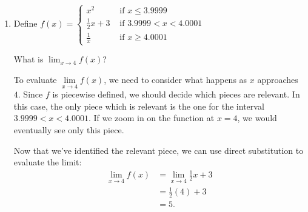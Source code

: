 \documentclass{article}
\begin{document}
\begin{enumerate}[resume]
\begin{enumerate}
      \begin{solution}
        $\displaystyle \lim_{x \rightarrow 4^-} g(x)=2$
      \end{solution}

    \end{enumerate}
  \probonly{\end{multicols}}

  \pspace{1in}

\item 


  \begin{problem}[\vfill]
    Define
    $\displaystyle f(x) =
      \begin{cases} 
        x^2 & \text{ if } x \leq 3.9999 \\
        \frac{1}{2} x + 3 & \text{ if } 3.9999 < x < 4.0001 \\
        \frac{1}{x} & \text{ if } x \geq 4.0001    
      \end{cases}$

    What is $\displaystyle \lim_{x \to 4} f(x)$?
  \end{problem}

  \begin{solution}
    To evaluate $\lim\limits_{x \to 4} f(x)$, we need to consider what happens as $x$ approaches $4$.
    Since $f$ is piecewise defined, we should decide which pieces are relevant. In this case,
    the only piece which is relevant is the one for the interval $3.9999 < x < 4.0001$. If we
    zoom in on the function at $x=4$, we would eventually see only this piece.

    Now that we've identified the relevant piece, we can use direct substitution to evaluate the limit:
    \begin{align*}
      \lim_{x \to 4} f(x) &= \lim_{x \to 4} \tfrac{1}{2} x + 3 \\
      &= \tfrac{1}{2}(4) + 3 \\
      &= 5.
    \end{align*}
  \end{solution}
\end{enumerate}
\end{document}
